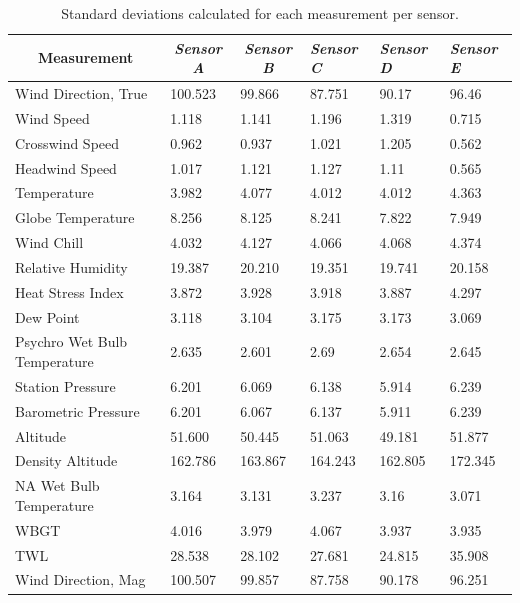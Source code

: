 \documentclass[a4paper,12pt]{article} %
\begin{document}
\begin{enumerate}
\begin{table}[H]
\centering
\caption{Standard deviations calculated for each measurement per sensor.}
\begin{tabular}{llllll}
\multicolumn{1}{c}{\textbf{Measurement}} & \multicolumn{1}{c}{\textit{Sensor A}} & \multicolumn{1}{c}{\textit{Sensor B}} & \textit{Sensor C} & \textit{Sensor D} & \textit{Sensor E}  \\ \hline
Wind Direction‚ True             & 100.523   & 99.866    & 87.751    & 90.17     & 96.46     \\
Wind Speed                   & 1.118     & 1.141     & 1.196     & 1.319     & 0.715     \\
Crosswind Speed              & 0.962     & 0.937     & 1.021     & 1.205     & 0.562     \\
Headwind Speed               & 1.017     & 1.121     & 1.127     & 1.11      & 0.565     \\
Temperature                  & 3.982     & 4.077     & 4.012     & 4.012     & 4.363     \\
Globe Temperature            & 8.256     & 8.125     & 8.241     & 7.822     & 7.949     \\
Wind Chill                   & 4.032     & 4.127     & 4.066     & 4.068     & 4.374     \\
Relative Humidity            & 19.387    & 20.210     & 19.351    & 19.741    & 20.158    \\
Heat Stress Index            & 3.872     & 3.928     & 3.918     & 3.887     & 4.297     \\
Dew Point                    & 3.118     & 3.104     & 3.175     & 3.173     & 3.069     \\
Psychro Wet Bulb Temperature & 2.635     & 2.601     & 2.69      & 2.654     & 2.645     \\
Station Pressure             & 6.201     & 6.069     & 6.138     & 5.914     & 6.239     \\
Barometric Pressure          & 6.201     & 6.067     & 6.137     & 5.911     & 6.239     \\
Altitude                     & 51.600      & 50.445    & 51.063    & 49.181    & 51.877    \\
Density Altitude             & 162.786   & 163.867   & 164.243   & 162.805   & 172.345   \\
NA Wet Bulb Temperature      & 3.164     & 3.131     & 3.237     & 3.16      & 3.071     \\
WBGT                         & 4.016     & 3.979     & 4.067     & 3.937     & 3.935     \\
TWL                          & 28.538    & 28.102    & 27.681    & 24.815    & 35.908    \\
Wind Direction‚ Mag              & 100.507   & 99.857    & 87.758    & 90.178    & 96.251   
\end{tabular}
\label{std-table}
\end{table}


\end{enumerate}
\end{document}
